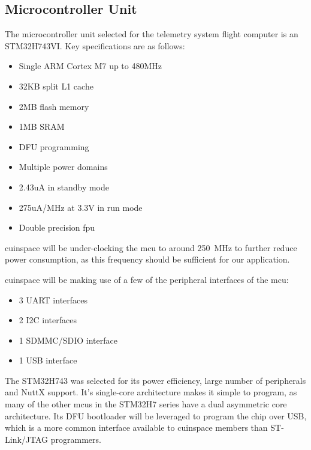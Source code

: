 \subsection{Microcontroller Unit}

The microcontroller unit selected for the telemetry system flight computer is an STM32H743VI. Key specifications are as
follows:

\begin{itemize}
    \item Single ARM Cortex M7 up to 480MHz \cite[1]{stm32h743vi}
    \item 32KB split L1 cache \cite[1]{stm32h743vi}
    \item 2MB flash memory \cite[1]{stm32h743vi}
    \item 1MB SRAM \cite[1]{stm32h743vi}
    \item DFU programming \cite[Sec. 3.4]{stm32h743vi}
    \item Multiple power domains \cite[1]{stm32h743vi}
    \item 2.43uA in standby mode \cite[1]{stm32h743vi}
    \item 275uA/MHz at 3.3V in run mode \cite[1]{stm32h743vi}
    \item Double precision \gls{fpu} \cite[1]{stm32h743vi}
\end{itemize}

\Gls{cuinspace} will be under-clocking the \gls{mcu} to around \qty{250}{\mega\hertz} to further reduce power consumption, as this frequency should be sufficient for our application.

\Gls{cuinspace} will be making use of a few of the peripheral interfaces of the \gls{mcu}:

\begin{itemize}
    \item 3 UART interfaces
    \item 2 I2C interfaces
    \item 1 SDMMC/SDIO interface
    \item 1 USB interface
\end{itemize}

The STM32H743 was selected for its power efficiency, large number of peripherals and NuttX support. It's single-core
architecture makes it simple to program, as many of the other \glspl{mcu} in the STM32H7 series have a dual asymmetric
core architecture. Its DFU bootloader will be leveraged to program the chip over USB, which is a more common interface
available to \gls{cuinspace} members than ST-Link/JTAG programmers.

